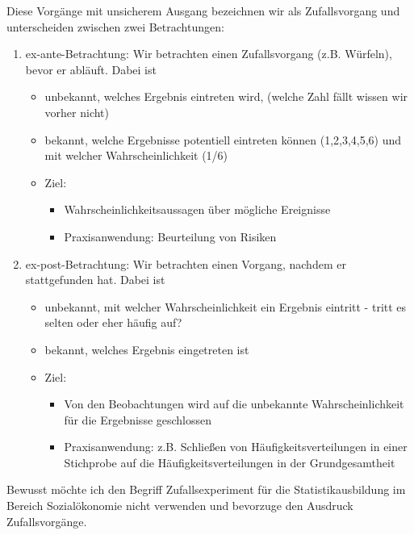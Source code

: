 Diese Vorgänge mit unsicherem Ausgang bezeichnen wir als Zufallsvorgang und unterscheiden zwischen zwei Betrachtungen:
\begin{enumerate}
	\item ex-ante-Betrachtung: Wir betrachten einen Zufallsvorgang (z.B. Würfeln), bevor er abläuft. Dabei ist 
		\begin{itemize}
			\item unbekannt, welches Ergebnis eintreten wird, (welche Zahl fällt wissen wir vorher nicht)
			\item bekannt, welche Ergebnisse potentiell eintreten können (1,2,3,4,5,6) und mit welcher Wahrscheinlichkeit (1/6)
			\item Ziel: 
				\begin{itemize}
					\item Wahrscheinlichkeitsaussagen über mögliche Ereignisse 
					\item Praxisanwendung: Beurteilung von Risiken
				\end{itemize}
		\end{itemize}
	\item ex-post-Betrachtung: Wir betrachten einen Vorgang, nachdem er stattgefunden hat. Dabei ist
		\begin{itemize}
			\item unbekannt, mit welcher Wahrscheinlichkeit ein Ergebnis eintritt - tritt es selten oder eher häufig auf?
			\item bekannt, welches Ergebnis eingetreten ist
			\item Ziel: 
				\begin{itemize}
					\item Von den Beobachtungen wird auf die unbekannte Wahrscheinlichkeit für die Ergebnisse geschlossen 
					\item Praxisanwendung: z.B. Schließen von Häufigkeitsverteilungen in einer Stichprobe auf die Häufigkeitsverteilungen in der Grundgesamtheit
				\end{itemize}
		\end{itemize}
\end{enumerate}

Bewusst möchte ich den Begriff Zufallsexperiment für die Statistikausbildung im Bereich Sozialökonomie nicht verwenden und bevorzuge den Ausdruck Zufallsvorgänge.

	\\

